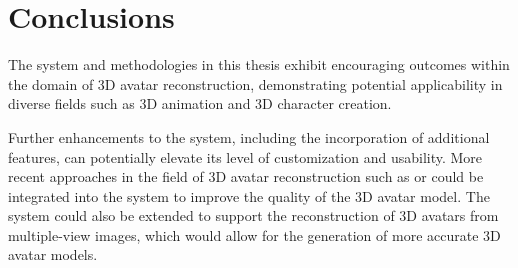 \section{Conclusions}\label{sec:conclusions}

The system and methodologies in this thesis exhibit encouraging outcomes within the domain of 3D avatar reconstruction, demonstrating potential applicability in diverse fields such as 3D animation and 3D character creation.



Further enhancements to the system, including the incorporation of additional features, can potentially elevate its level of customization and usability. More recent approaches in the field of 3D avatar reconstruction such as  or  could be integrated into the system to improve the quality of the 3D avatar model. The system could also be extended to support the reconstruction of 3D avatars from multiple-view images, which would allow for the generation of more accurate 3D avatar models.